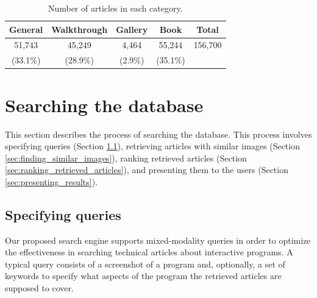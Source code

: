 \documentclass{www2010-submission}
\begin{document}
\begin{table}
\centering \caption{Number of articles in each category.}
\label{tbl:category_distribution}

\begin{tabular}{|c|c|c|c||c|}
\hline
      General & Walkthrough & Gallery & Book & Total\\
\hline
 51,743 & 45,249 & 4,464 & 55,244 & 156,700\\
 
 (33.1\%) & (28.9\%) & (2.9\%) & (35.1\%) & \\
\hline
\end{tabular}

\end{table}





\section{Searching the database}
\label{sec:searching}

This section describes the process of searching the database. This
process involves specifying queries (Section
\ref{sec:specifying_queries}), 
retrieving articles with similar
images (Section \ref{sec:finding_similar_images}), ranking retrieved
articles
(Section \ref{sec:ranking_retrieved_articles}), and presenting them to
the users
(Section \ref{sec:presenting_results}).

\subsection{Specifying queries}
\label{sec:specifying_queries}

Our proposed search engine supports mixed-modality queries in order to
optimize the effectiveness in searching technical articles about
interactive programs. A typical query consists of a screenshot of a
program and, optionally, a set of keywords to specify what aspects of
the program the retrieved articles are supposed to cover.
\end{document}

